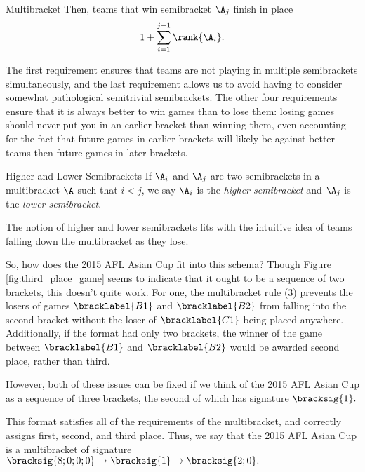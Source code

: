 {\begin{definition}{Multibracket}{}
        Then, teams that win semibracket $\A_j$ finish in place $$1 + \sum_{i=1}^{j-1} \rank{\A_i}.$$
    \end{definition}

    The first requirement ensures that teams are not playing in multiple semibrackets simultaneously, and the last requirement allows us to avoid having to consider somewhat pathological semitrivial semibrackets. The other four requirements ensure that it is always better to win games than to lose them: losing games should never put you in an earlier bracket than winning them, even accounting for the fact that future games in earlier brackets will likely be against better teams then future games in later brackets.


    \begin{definition}{Higher and Lower Semibrackets}{}
        If $\A_i$ and $\A_j$ are two semibrackets in a multibracket $\A$ such that $i < j$, we say $\A_i$ is the \textit{higher semibracket} and $\A_j$ is the \textit{lower semibracket}.
    \end{definition}

    The notion of higher and lower semibrackets fits with the intuitive idea of teams falling down the multibracket as they lose.

    So, how does the 2015 AFL Asian Cup fit into this schema? Though Figure \ref{fig:third_place_game} seems to indicate that it ought to be a sequence of two brackets, this doesn't quite work. For one, the multibracket rule (3) prevents the losers of games $\bracklabel{B1}$ and $\bracklabel{B2}$ from falling into the second bracket without the loser of $\bracklabel{C1}$ being placed anywhere. Additionally, if the format had only two brackets, the winner of the game between $\bracklabel{B1}$ and $\bracklabel{B2}$ would be awarded second place, rather than third.

    However, both of these issues can be fixed if we think of the 2015 AFL Asian Cup as a sequence of three brackets, the second of which has signature $\bracksig{1}.$



    This format satisfies all of the requirements of the multibracket, and correctly assigns first, second, and third place. Thus, we say that the 2015 AFL Asian Cup is a multibracket of signature $\bracksig{8;0;0;0} \to \bracksig{1} \to \bracksig{2;0}.$ 

}
